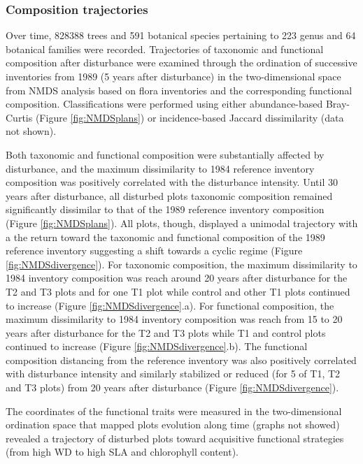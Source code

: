 \documentclass[fleqn,10pt]{ArtEcoFoG} %
\theoremstyle{definition}
\theoremstyle{definition}
\theoremstyle{definition}
\theoremstyle{remark}
\begin{document}
\subsubsection{Composition trajectories}\label{composition-trajectories}

Over time, 828388 trees and 591 botanical species pertaining to 223
genus and 64 botanical families were recorded. Trajectories of taxonomic
and functional composition after disturbance were examined through the
ordination of successive inventories from 1989 (5 years after
disturbance) in the two-dimensional space from NMDS analysis based on
flora inventories and the corresponding functional composition.
Classifications were performed using either abundance-based Bray-Curtis
(Figure \ref{fig:NMDSplans}) or incidence-based Jaccard dissimilarity
(data not shown).

Both taxonomic and functional composition were substantially affected by
disturbance, and the maximum dissimilarity to 1984 reference inventory
composition was positively correlated with the disturbance intensity.
Until 30 years after disturbance, all disturbed plots taxonomic
composition remained significantly dissimilar to that of the 1989
reference inventory composition (Figure \ref{fig:NMDSplans}). All plots,
though, displayed a unimodal trajectory with a the return toward the
taxonomic and functional composition of the 1989 reference inventory
suggesting a shift towards a cyclic regime (Figure
\ref{fig:NMDSdivergence}). For taxonomic composition, the maximum
dissimilarity to 1984 inventory composition was reach around 20 years
after disturbance for the T2 and T3 plots and for one T1 plot while
control and other T1 plots continued to increase (Figure
\ref{fig:NMDSdivergence}.a). For functional composition, the maximum
dissimilarity to 1984 inventory composition was reach from 15 to 20
years after disturbance for the T2 and T3 plots while T1 and control
plots continued to increase (Figure \ref{fig:NMDSdivergence}.b). The
functional composition distancing from the reference inventory was also
positively correlated with disturbance intensity and similarly
stabilized or reduced (for 5 of T1, T2 and T3 plots) from 20 years after
disturbance (Figure \ref{fig:NMDSdivergence}).

The coordinates of the functional traits were measured in the
two-dimensional ordination space that mapped plots evolution along time
(graphs not showed) revealed a trajectory of disturbed plots toward
acquisitive functional strategies (from high WD to high SLA and
chlorophyll content).
\end{document}
